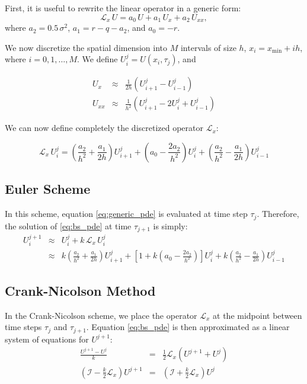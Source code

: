 \documentclass[11pt, letterpaper]{article}
\begin{document}
    First, it is useful to rewrite the linear operator in a generic form:
    \begin{equation}\label{eq:generic_pde}
        \mathcal{L}_x\, U = a_0\, U + a_1\, U_x + a_2\, U_{xx},
    \end{equation}
    where $a_2 = 0.5\, \sigma^2$, $a_1 = r - q - a_2$, and $a_0 = -r$.

    We now discretize the spatial dimension into $M$ intervals of size $h$, $x_i = x_{\min} + i h$, where $i = 0, 1, \ldots, M$.
    We define $U_i^j = U(x_i, \tau_j)$, and

    \begin{eqnarray}
        U_{x} & \approx & \frac{1}{2h} \left(U_{i+1}^j - U_{i-1}^j\right) \label{eq:ders}\\
        U_{xx} & \approx & \frac{1}{h^2} \left(U_{i+1}^j - 2 U_i^j + U_{i-1}^j\right)\nonumber
    \end{eqnarray}

    We can now define completely the discretized operator $\mathcal{L}_x$:

    \begin{equation}\label{eq:operator}
        \mathcal{L}_x\, U_i^j = \left(\frac{a_2}{h^2} + \frac{a_1}{2h}\right) U_{i+1}^j + \left(a_0 - \frac{2a_2}{h^2}\right) U_i^j + \left(\frac{a_2}{h^2} - \frac{a_1}{2h}\right) U_{i-1}^j
    \end{equation}

        \subsection{Euler Scheme}\label{sec:euler_scheme}
        In this scheme, equation \eqref{eq:generic_pde} is evaluated at time step $\tau_j$.
        Therefore, the solution of \eqref{eq:bs_pde} at time $\tau_{j+1}$ is simply:
        \begin{eqnarray}
            U_i^{j+1} &\approx& U_i^j + k\, \mathcal{L}_x\, U_i^j \nonumber\\
            &\approx& k \left(\frac{a_2}{h^2} + \frac{a_1}{2h}\right) U_{i+1}^j + \left[1 + k\left(a_0 - \frac{2a_2}{h^2}\right)\right] U_i^j + k \left(\frac{a_2}{h^2} - \frac{a_1}{2h}\right) U_{i-1}^j
        \end{eqnarray}

        \subsection{Crank-Nicolson Method}\label{sec:cn_method}
        In the Crank-Nicolson scheme, we place the operator $\mathcal{L}_x$ at the midpoint between time steps $\tau_j$ and $\tau_{j+1}$.
        Equation \eqref{eq:bs_pde} is then approximated as a linear system of equations for $U^{j+1}$:
        \begin{eqnarray}
            \frac{U^{j+1} - U^j}{k} &=& \frac 1 2 \mathcal{L}_x (U^{j+1} + U^j)\nonumber\\
            \left(\mathcal{I} - \frac k  2 \mathcal{L}_x\right) U^{j+1} &=& \left(\mathcal{I} + \frac k  2 \mathcal{L}_x\right) U^j\label{eq:op_form}
        \end{eqnarray}
\end{document}
